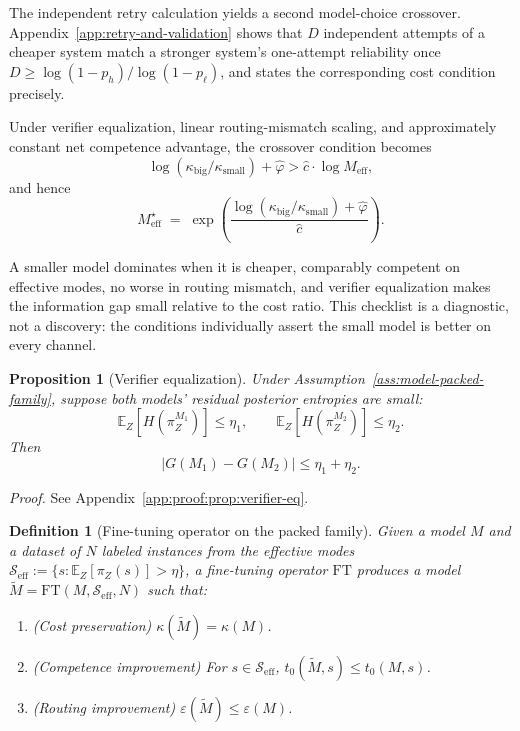 \documentclass[10pt]{article}
\theoremstyle{paperplain}
\newtheorem{proposition}[theorem]{Proposition}
\theoremstyle{paperdefinition}
\newtheorem{definition}[theorem]{Definition}
\theoremstyle{paperremark}
\newcommand{\E}{\mathbb{E}}
\newcommand{\cS}{\mathcal{S}}
\newcommand{\Meff}{M_{\mathrm{eff}}}
\begin{document}
The independent retry calculation yields a second model-choice crossover. Appendix~\ref{app:retry-and-validation} shows that $D$ independent attempts of a cheaper system match a stronger system's one-attempt reliability once
$D\ge \log(1-p_h)/\log(1-p_\ell)$, and states the corresponding cost condition precisely.


Under verifier equalization, linear routing-mismatch scaling, and approximately constant net competence advantage, the crossover condition becomes
\[
\log(\kappa_{\mathrm{big}}/\kappa_{\mathrm{small}}) + \hat\varphi > \hat{c} \cdot \log\Meff,
\]
and hence
\begin{equation}
\label{eq:meff-threshold}
\Meff^\star \;=\; \exp\!\left(\frac{\log(\kappa_{\mathrm{big}}/\kappa_{\mathrm{small}}) + \hat\varphi}{\hat c}\right).
\end{equation}

A smaller model dominates when it is cheaper, comparably competent on effective modes, no worse in routing mismatch, and verifier equalization makes the information gap small relative to the cost ratio. This checklist is a diagnostic, not a discovery: the conditions individually assert the small model is better on every channel.

\begin{proposition}[Verifier equalization]
\label{prop:verifier-eq}
Under Assumption~\ref{ass:model-packed-family}, suppose both models' residual posterior entropies are small:
\[
\E_Z[H(\pi_Z^{M_1})] \le \eta_1, \qquad \E_Z[H(\pi_Z^{M_2})] \le \eta_2.
\]
Then
\[
|G(M_1) - G(M_2)| \le \eta_1 + \eta_2.
\]
\end{proposition}

\par\noindent\emph{Proof.} See Appendix~\ref{app:proof:prop:verifier-eq}.\par


\begin{definition}[Fine-tuning operator on the packed family]
\label{def:finetuning-operator}
Given a model $M$ and a dataset of $N$ labeled instances from the effective modes
$\cS_{\mathrm{eff}} := \{s : \E_Z[\pi_Z(s)] > \eta\}$,
a fine-tuning operator $\mathrm{FT}$ produces a model
$\widetilde M = \mathrm{FT}(M,\cS_{\mathrm{eff}},N)$ such that:
\begin{enumerate}
\item \textup{(Cost preservation)} $\kappa(\widetilde M)=\kappa(M)$.
\item \textup{(Competence improvement)} For $s\in\cS_{\mathrm{eff}}$, $t_0(\widetilde M,s)\le t_0(M,s)$.
\item \textup{(Routing improvement)} $\varepsilon(\widetilde M)\le \varepsilon(M)$.
\end{enumerate}
\end{definition}
\end{document}
